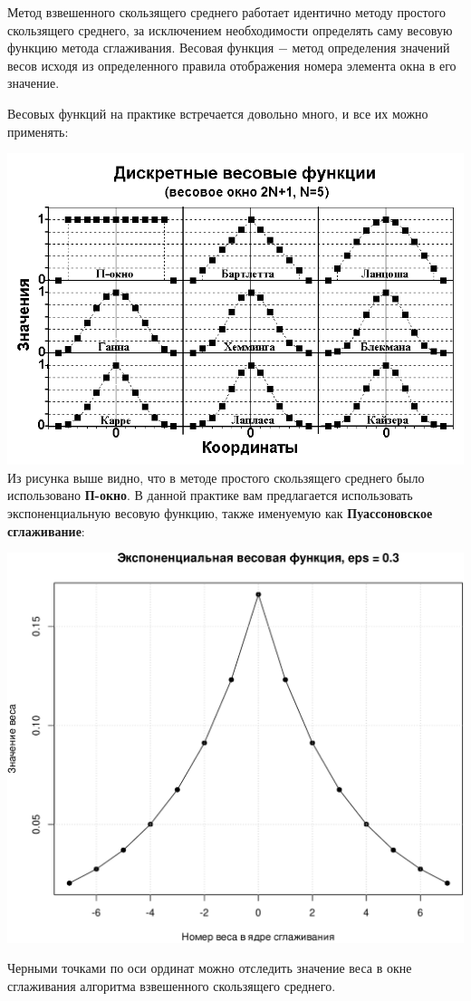 \documentclass[
]{article}
\begin{document}
Метод взвешенного скользящего среднего работает идентично методу
простого скользящего среднего, за исключением необходимости определять
саму весовую функцию метода сглаживания. Весовая функция \(-\) метод
определения значений весов исходя из определенного правила отображения
номера элемента окна в его значение.

Весовых функций на практике встречается довольно много, и все их можно
применять:

\includegraphics{Weight_funcs.png} Из рисунка выше видно, что в методе
простого скользящего среднего было использовано \textbf{П-окно}. В
данной практике вам предлагается использовать экспоненциальную весовую
функцию, также именуемую как \textbf{Пуассоновское сглаживание}:

\begin{center}\includegraphics[width=0.6\linewidth]{Prac6_files/figure-latex/unnamed-chunk-8-1} \end{center}

Черными точками по оси ординат можно отследить значение веса в окне
сглаживания алгоритма взвешенного скользящего среднего.
\end{document}
